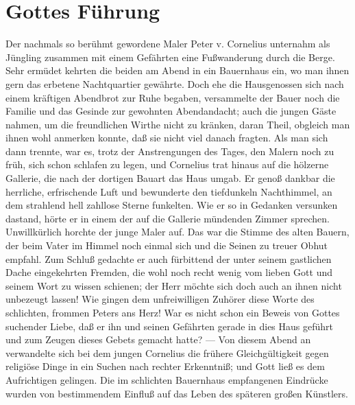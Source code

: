 \chapter{Gottes Führung}

Der nachmals so berühmt gewordene Maler Peter v. Cornelius unternahm als Jüngling zusammen mit einem Gefährten eine Fußwanderung durch die Berge. Sehr ermüdet kehrten die beiden am Abend in ein Bauernhaus ein, wo man ihnen gern das erbetene Nachtquartier gewährte. Doch ehe die Hausgenossen sich nach einem kräftigen Abendbrot zur Ruhe begaben, versammelte der Bauer noch die Familie und das Gesinde zur gewohnten Abendandacht; auch die jungen Gäste nahmen, um die freundlichen Wirthe nicht zu kränken, daran Theil, obgleich man ihnen wohl anmerken konnte, daß sie nicht viel danach fragten. Als man sich dann trennte, war es, trotz der Anstrengungen des Tages, den Malern noch zu früh, sich schon schlafen zu legen, und Cornelius trat hinaus auf die hölzerne Gallerie, die nach der dortigen Bauart das Haus umgab. Er genoß dankbar die herrliche, erfrischende Luft und bewunderte den tiefdunkeln Nachthimmel, an dem strahlend hell zahllose Sterne funkelten. Wie er so in Gedanken versunken dastand, hörte er in einem der auf die Gallerie mündenden Zimmer sprechen. Unwillkürlich horchte der junge Maler auf. Das war die Stimme des alten Bauern, der beim Vater im Himmel noch einmal sich und die Seinen zu treuer Obhut empfahl. Zum Schluß gedachte er auch fürbittend der unter seinem gastlichen Dache eingekehrten Fremden, die wohl noch recht wenig vom lieben Gott und seinem Wort zu wissen schienen; der Herr möchte sich doch auch an ihnen nicht unbezeugt lassen! Wie gingen dem unfreiwilligen Zuhörer diese Worte des schlichten, frommen Peters ans Herz! War es nicht schon ein Beweis von Gottes suchender Liebe, daß er ihn und seinen Gefährten gerade in dies Haus geführt und zum Zeugen dieses Gebets gemacht hatte? — Von diesem Abend an verwandelte sich bei dem jungen Cornelius die frühere Gleichgültigkeit gegen religiöse Dinge in ein Suchen nach rechter Erkenntniß; und Gott ließ es dem Aufrichtigen gelingen. Die im schlichten Bauernhaus empfangenen Eindrücke wurden von bestimmendem Einfluß auf das Leben des späteren großen Künstlers.
